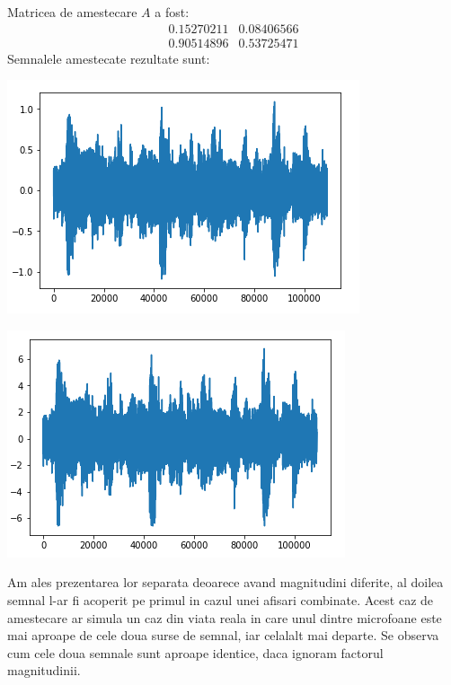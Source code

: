 \documentclass[12pt]{article}
\begin{document}
Matricea de amestecare $A$ a fost:
\[
 \begin{matrix}
	0.15270211 & 0.08406566 \\
	0.90514896 & 0.53725471
 \end{matrix}
\]
Semnalele amestecate rezultate sunt:
\begin{center}
	\includegraphics[scale=1]{music_mixed_1}
 \end{center}
\begin{center}
	\includegraphics[scale=1]{music_mixed_2}
 \end{center}
 Am ales prezentarea lor separata deoarece avand magnitudini diferite, al doilea semnal l-ar fi acoperit pe primul in cazul unei afisari combinate. Acest caz de amestecare ar simula un caz din viata reala in care unul dintre microfoane este mai aproape de cele doua surse de semnal, iar celalalt mai departe. Se observa cum cele doua semnale sunt aproape identice, daca ignoram factorul magnitudinii. 
\end{document}
